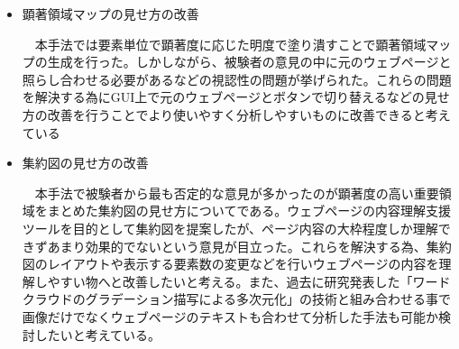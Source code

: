 \begin{itemize}
  \item 顕著領域マップの見せ方の改善
  \par ~~本手法では要素単位で顕著度に応じた明度で塗り潰すことで顕著領域マップの生成を行った。しかしながら、被験者の意見の中に元のウェブページと照らし合わせる必要があるなどの視認性の問題が挙げられた。これらの問題を解決する為にGUI上で元のウェブページとボタンで切り替えるなどの見せ方の改善を行うことでより使いやすく分析しやすいものに改善できると考えている\\

  \item 集約図の見せ方の改善
  \par ~~本手法で被験者から最も否定的な意見が多かったのが顕著度の高い重要領域をまとめた集約図の見せ方についてである。ウェブページの内容理解支援ツールを目的として集約図を提案したが、ページ内容の大枠程度しか理解できずあまり効果的でないという意見が目立った。これらを解決する為、集約図のレイアウトや表示する要素数の変更などを行いウェブページの内容を理解しやすい物へと改善したいと考える。また、過去に研究発表した「ワードクラウドのグラデーション描写による多次元化」\cite{inagaki2018}の技術と組み合わせる事で画像だけでなくウェブページのテキストも合わせて分析した手法も可能か検討したいと考えている。
  \\
\end{itemize}